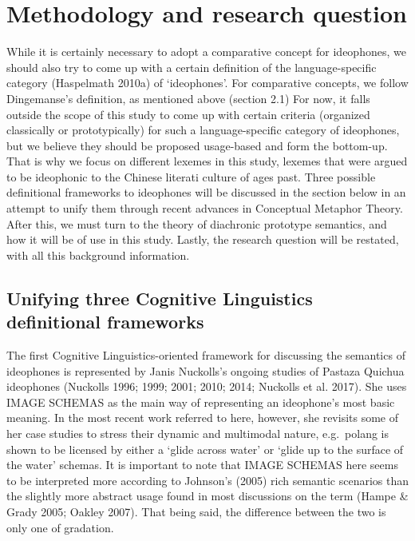 \documentclass[12pt,article,oneside]{memoir}
\theoremstyle{definition}
\theoremstyle{definition}
\theoremstyle{definition}
\theoremstyle{remark}
\begin{document}
\section{Methodology and research
question}\label{methodology-and-research-question}

While it is certainly necessary to adopt a comparative concept for
ideophones, we should also try to come up with a certain definition of
the language-specific category (Haspelmath 2010a) of `ideophones'. For
comparative concepts, we follow Dingemanse's definition, as mentioned
above (section 2.1) For now, it falls outside the scope of this study to
come up with certain criteria (organized classically or prototypically)
for such a language-specific category of ideophones, but we believe they
should be proposed usage-based and form the bottom-up. That is why we
focus on different lexemes in this study, lexemes that were argued to be
ideophonic to the Chinese literati culture of ages past. Three possible
definitional frameworks to ideophones will be discussed in the section
below in an attempt to unify them through recent advances in Conceptual
Metaphor Theory. After this, we must turn to the theory of diachronic
prototype semantics, and how it will be of use in this study. Lastly,
the research question will be restated, with all this background
information.

\subsection{Unifying three Cognitive Linguistics definitional
frameworks}\label{unifying-three-cognitive-linguistics-definitional-frameworks}

The first Cognitive Linguistics-oriented framework for discussing the
semantics of ideophones is represented by Janis Nuckolls's ongoing
studies of Pastaza Quichua ideophones (Nuckolls 1996; 1999; 2001; 2010;
2014; Nuckolls et al. 2017). She uses IMAGE SCHEMAS as the main way of
representing an ideophone's most basic meaning. In the most recent work
referred to here, however, she revisits some of her case studies to
stress their dynamic and multimodal nature, e.g.~polang is shown to be
licensed by either a `glide across water' or `glide up to the surface of
the water' schemas. It is important to note that IMAGE SCHEMAS here
seems to be interpreted more according to Johnson's (2005) rich semantic
scenarios than the slightly more abstract usage found in most
discussions on the term (Hampe \& Grady 2005; Oakley 2007). That being
said, the difference between the two is only one of gradation.
\end{document}
